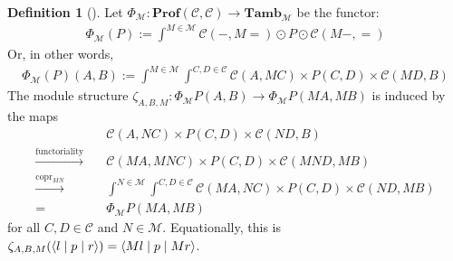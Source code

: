 \documentclass[11pt,letterpaper]{article}
\theoremstyle{plain}
\theoremstyle{definition}
\newtheorem{definition}[theorem]{Definition}
\newcommand{\C}{\mathscr{C}}
\newcommand{\M}{\mathscr{M}}
\newcommand{\Pastro}{\Phi}
\newcommand{\Prof}{\mathbf{Prof}}
\newcommand{\Tamb}{\mathbf{Tamb}}
\DeclareMathOperator{\copr}{copr}
\newcommand{\repthree}[3]{{\ensuremath \langle #1 \mid #2 \mid #3 \rangle}}
\begin{document}
\begin{definition}[{\cite[Section 5]{Doubles}}]
  Let $\Pastro_\M : \Prof(\C, \C) \to \Tamb_\M$ be the functor:
  \begin{align*}
    \Pastro_\M(P) := \int^{M \in \M}  \C(-, M{=}) \odot P \odot \C(M-, {=})
  \end{align*}
  Or, in other words,
  \begin{align*}
    \Pastro_\M(P)(A,B) := \int^{M \in \M} \int^{C,D \in \C} \C(A, MC) \times P(C,D) \times  \C(MD, B)
  \end{align*}
  The module structure $\zeta_{A,B,M} : \Pastro_\M P(A,B) \to \Pastro_\M P (MA, MB)
  $ is induced by the maps
  \begin{align*}
    &\C(A, NC) \times P(C,D) \times  \C(ND, B) \\
    \xrightarrow{\text{functoriality}} \quad& \C(MA, MNC) \times P(C,D) \times  \C(MND, MB) \\
    \xrightarrow{\copr_{MN}} \quad&\int^{N \in \M} \int^{C,D \in \C} \C(MA, NC) \times P(C,D) \times  \C(ND, MB) \\
    = \quad&\Pastro_\M P (MA, MB)
  \end{align*}
  for all $C, D \in \C$ and $N \in \M$. Equationally, this is $\zeta_{A,B,M}(\repthree{l}{p}{r} ) = \repthree{Ml}{p}{Mr} $.
\end{definition}
\end{document}
